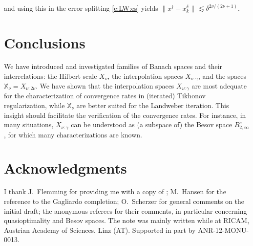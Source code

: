 \documentclass[10pt, a4paper]{iopart}
\newcommand{\IX}{\mathbb{X}}
\newcommand{\norm}[2]{     \| #1       \|_{ #2 }}
\theoremstyle{remark}
\theoremstyle{definition}
\providecommand{\REV}[1]{{#1}}
\begin{document}
%
and using this in the error splitting \eqref{e:LW:es} 
yields
$\norm{ x^\dag - x_k^\delta }{} \lesssim \delta^{2 \nu / (2 \nu + 1)}$.
%
%

%





\section{Conclusions}
\label{s:99}

We have 
introduced and investigated
families of Banach spaces 
and
their interrelations:
the Hilbert scale $X_\nu$, the interpolation spaces $X_{\nu:\gamma}$,
and
the spaces $\IX_\nu = X_{\nu : 2 \nu}$.
%
We have shown that 
the interpolation spaces $X_{\nu:\gamma}$
are most adequate for the characterization of convergence rates 
in (iterated) Tikhonov regularization,
while
$\IX_\nu$ are better suited
for the Landweber iteration.
%
%
\REV{%
This insight should facilitate
the verification 
of 
the convergence rates.
%
For instance,
in many situations,
$X_{\nu:\gamma}$
can be understood as (a subspace of)
the
Besov space $B_{2,\infty}^s$, 
for which many characterizations are known.
}%


\section*{Acknowledgments}

I thank 
J.~Flemming for providing me with a copy of \cite{Flemming2012};
M.~Hansen for the reference to the Gagliardo completion;
O.~Scherzer for general comments on the initial draft;
the anonymous referees for their comments,
in particular
concerning quasioptimality \cite{RausHamarik2007} and Besov spaces.
%
%
The note was mainly written while at RICAM, Austrian Academy of Sciences, Linz (AT).
%
%
Supported in part by ANR-12-MONU-0013.
\end{document}
